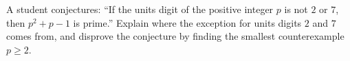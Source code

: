 A student conjectures: ``If the units digit of the positive integer $p$ is not $2$ or $7$, then $p^2+p-1$ is prime.'' Explain where the exception for units digits $2$ and $7$ comes from, and disprove the conjecture by finding the smallest counterexample $p\ge2$.
